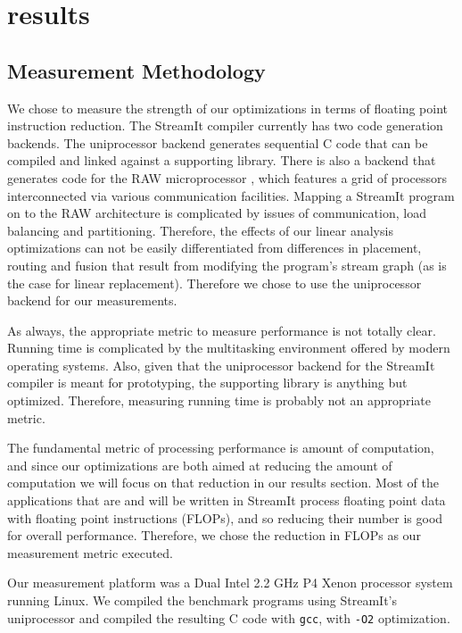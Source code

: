 \section{results}

\subsection{Measurement Methodology}
We chose to measure the strength of our optimizations in terms of 
floating point instruction reduction. The StreamIt compiler currently
has two code generation backends. The uniprocessor backend generates sequential C code
that can be compiled and linked against a supporting library. 
There is also a backend that generates code for the RAW microprocessor
\cite{waingold97baring, raw-micro}, which features
a grid of processors interconnected via various communication facilities. 
Mapping a StreamIt program on to the RAW architecture is complicated
by issues of communication, load balancing and partitioning\cite{streamit-asplos}. 
Therefore, the effects of our linear analysis optimizations can not
be easily differentiated from differences in placement, routing and fusion that result
from modifying the program's stream graph (as is the case for linear replacement). 
Therefore we chose to use the uniprocessor backend for our measurements.

As always, the appropriate metric to measure performance is not totally clear. 
Running time is complicated by the multitasking environment offered by 
modern operating systems. Also, given that the uniprocessor backend for
the StreamIt compiler is meant for prototyping, the supporting 
library is anything but optimized. Therefore, measuring running time is
probably not an appropriate metric.

The fundamental metric of processing performance is amount of computation, and since
our optimizations are both aimed at reducing the amount of computation we will focus 
on that reduction in our results section. Most of the applications that are and will
be written in StreamIt process floating point data with floating point instructions (FLOPs), 
and so reducing their number is good for overall performance. 
Therefore, we chose the reduction in FLOPs as our measurement metric executed.

Our measurement platform was a Dual Intel 2.2 GHz P4 Xenon processor system 
running Linux. We compiled the benchmark programs using StreamIt's uniprocessor
and compiled the resulting C code with {\tt gcc}, with {\tt -O2} optimization.

